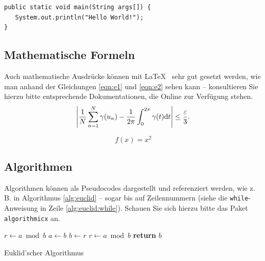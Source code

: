 		\newpage
		
		
\lstset{language=Java}
\begin{lstlisting}[caption={Hello World!}, label={lst:helloworld}]
public static void main(String args[]) {
   System.out.println("Hello World!");
}
\end{lstlisting}


\subsection{Mathematische Formeln}
Auch mathematische Ausdrücke können mit \LaTeX~ sehr gut gesetzt werden, wie man anhand der Gleichungen \vref{eqn:e1} und \vref{eqn:e2} sehen kann -- konsultieren Sie hierzu bitte entsprechende Dokumentationen, die Online zur Verfügung stehen.
\begin{equation}
\left|{1\over N}\sum_{n=1}^N \gamma(u_n)-{1\over 2\pi}\int_0^{2\pi}\gamma(t){\rm d}t\right| \le {\varepsilon\over 3}.\\
\label{eqn:e1}
\end{equation}

\begin{equation}
f(x)=x^2
\label{eqn:e2}
\end{equation}


\subsection{Algorithmen}
Algorithmen können als Pseudocodes dargestellt und referenziert werden, wie z.\,B. in Algorithmus \vref{alg:euclid} -- sogar bis auf Zeilennummern
(siehe die \texttt{while}-Anweisung in Zeile \vref{alg:euclid:while}). Schauen Sie sich hierzu bitte das Paket \texttt{algorithmicx} an.



\begin{algorithm}
\begin{algorithmic}[1]
   \State $r\gets a\bmod b$
    \label{alg:euclid:while}
      \State $a\gets b$
      \State $b\gets r$
      \State $r\gets a\bmod b$
   \EndWhile\label{euclidendwhile}
   \State \textbf{return} $b$
\EndProcedure
\end{algorithmic}
\caption{Euklid'scher Algorithmus}\label{alg:euclid}
\end{algorithm}

